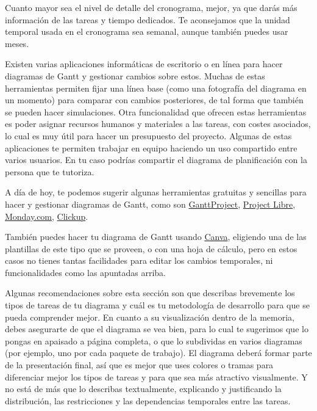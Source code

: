 Cuanto mayor sea el nivel de detalle del cronograma, mejor, ya que darás más información de las tareas y tiempo dedicados. Te aconsejamos que la unidad temporal usada en el cronograma sea semanal, aunque también puedes usar meses. 

Existen varias aplicaciones informáticas de escritorio o en línea para hacer diagramas de Gantt y gestionar cambios sobre estos. Muchas de estas herramientas permiten fijar una línea base (como una fotografía del diagrama en un momento) para comparar con cambios posteriores, de tal forma que también se pueden hacer simulaciones. Otra funcionalidad que ofrecen estas herramientas es poder asignar recursos humanos y materiales a las tareas, con costes asociados, lo cual es muy útil para hacer un presupuesto del proyecto. Algunas de estas aplicaciones te permiten trabajar en equipo haciendo un uso compartido entre varios usuarios. En tu caso podrías compartir el diagrama de planificación con la persona que te tutoriza.

A día de hoy, te podemos sugerir algunas herramientas gratuitas y sencillas para hacer y gestionar diagramas de Gantt, como son \href{https://www.ganttproject.biz/}{GanttProject}, \href{https://www.projectlibre.com/}{Project Libre}, 
 \href{https://www.monday.com}{Monday.com}, \href{https://app.clickup.com/}{Clickup}. 

También puedes hacer tu diagrama de Gantt usando \href{https://www.canva.com/}{Canva}, eligiendo una de las plantillas de este tipo que se proveen, o con una hoja de cálculo, pero en estos casos no tienes tantas facilidades para editar los cambios temporales, ni funcionalidades como las apuntadas arriba.

Algunas recomendaciones sobre esta sección son que describas brevemente los tipos de tareas de tu diagrama y cuál es tu metodología de desarrollo para que se pueda comprender mejor. En cuanto a su visualización dentro de la memoria, debes asegurarte de que el diagrama se vea bien, para lo cual te sugerimos que lo pongas en apaisado a página completa, o que lo subdividas en varios diagramas (por ejemplo, uno por cada paquete de trabajo). El diagrama deberá formar parte de la presentación final, así que es mejor que uses colores o tramas para diferenciar mejor los tipos de tareas y para que sea más atractivo visualmente. Y no está de más que lo describas textualmente, explicando y justificando la distribución, las restricciones y las dependencias temporales entre las tareas.

